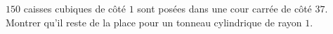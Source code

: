 $150$ caisses cubiques de côté $1$ sont posées dans une cour carrée de côté $37$. Montrer qu'il reste de la place pour un tonneau cylindrique de rayon $1$.
